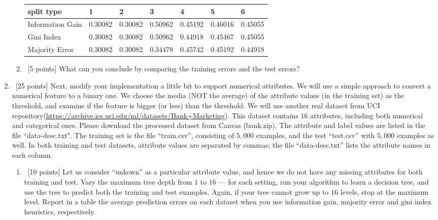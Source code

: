 \documentclass[12pt, fullpage,letterpaper]{article}
\begin{document}
\begin{enumerate}
\begin{enumerate}
\begin{tabular}{|l|l|l|l|l|l|l|}
	\hline
	split type       & 1       & 2       & 3       & 4       & 5       & 6       \\ \hline
	Information Gain & 0.30082 & 0.30082 & 0.50962 & 0.45192 & 0.46016 & 0.45055 \\ \hline
	Gini Index       & 0.30082 & 0.30082 & 0.50962 & 0.44918 & 0.45467 & 0.45055 \\ \hline
	Majority Error   & 0.30082 & 0.30082 & 0.34478 & 0.45742 & 0.45192 & 0.44918 \\ \hline
	\end{tabular}
	
\item~[5 points] What can you conclude by comparing the training errors and the test errors? 
\end{enumerate}


\item~[25 points] Next, modify your implementation a little bit to support numerical attributes. We will use a simple approach to convert a numerical feature to a binary one. We choose the media (NOT the average) of the attribute values (in the training set) as the threshold, and examine if the feature is bigger (or less) than the threshold. We will use another real dataset from UCI repository(\url{https://archive.ics.uci.edu/ml/datasets/Bank+Marketing}). This dataset contains $16$ attributes, including both numerical and categorical ones. Please download the processed dataset from Canvas (bank.zip).  The attribute and label values are listed in the file ``data-desc.txt". The training set is the file ``train.csv'', consisting of $5,000$ examples, and the test  ``test.csv'' with $5,000$ examples as well.  In both training and test datasets, attribute values are separated by commas; the file ``data-desc.txt''  lists the attribute names in each column. 
\begin{enumerate}
	\item~[10 points] Let us consider ``unkown'' as a particular attribute value, and hence we do not have any missing attributes for both training and test. Vary the maximum  tree depth from $1$ to $16$ --- for each setting, run your algorithm to learn a decision tree, and use the tree to  predict both the training  and test examples. Again, if your tree cannot grow up to $16$ levels, stop at the maximum level. Report in a table the average prediction errors on each dataset when you use information gain, majority error and gini index heuristics, respectively.
	

\end{enumerate}
\end{enumerate}
\end{document}
